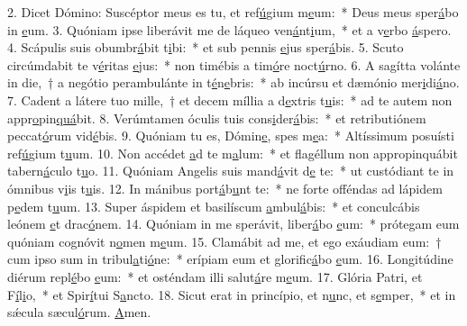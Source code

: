 2. Dicet Dómino: Suscéptor meus es tu, et ref\uline{ú}gium m\uline{e}um:~* Deus meus sper\uline{á}bo in \uline{e}um.
3. Quóniam ipse liberávit me de láqueo ven\uline{á}nt\uline{i}um,~* et a v\uline{e}rbo \uline{á}spero.
4. Scápulis suis obumbr\uline{á}bit t\uline{i}bi:~* et sub pennis \uline{e}jus sper\uline{á}bis.
5. Scuto circúmdabit te v\uline{é}ritas \uline{e}jus:~* non timébis a tim\uline{ó}re noct\uline{ú}rno.
6. A sagítta volánte in die,~† a negótio perambulánte in t\uline{é}n\uline{e}bris:~* ab incúrsu et dæmónio mer\uline{i}di\uline{á}no.
7. Cadent a látere tuo mille,~† et decem míllia a d\uline{e}xtris t\uline{u}is:~* ad te autem non appr\uline{o}pin\uline{quá}bit.
8. Verúmtamen óculis tuis cons\uline{i}der\uline{á}bis:~* et retributiónem peccat\uline{ó}rum vid\uline{é}bis.
9. Quóniam tu es, Dómin\uline{e}, spes m\uline{e}a:~* Altíssimum posuísti ref\uline{ú}gium t\uline{u}um.
10. Non accédet \uline{a}d te m\uline{a}lum:~* et flagéllum non appropinquábit tabern\uline{á}culo t\uline{u}o.
11. Quóniam Angelis suis mand\uline{á}vit d\uline{e} te:~* ut custódiant te in ómnibus v\uline{i}is t\uline{u}is.
12. In mánibus port\uline{á}b\uline{u}nt te:~* ne forte offéndas ad lápidem p\uline{e}dem t\uline{u}um.
13. Super áspidem et basilíscum \uline{a}mbul\uline{á}bis:~* et conculcábis leónem \uline{e}t drac\uline{ó}nem.
14. Quóniam in me sperávit, liber\uline{á}bo \uline{e}um:~* prótegam eum quóniam cognóvit n\uline{o}men m\uline{e}um.
15. Clamábit ad me, et ego exáudiam eum:~† cum ipso sum in tribul\uline{a}ti\uline{ó}ne:~* erípiam eum et glorific\uline{á}bo \uline{e}um.
16. Longitúdine diérum repl\uline{é}bo \uline{e}um:~* et osténdam illi salut\uline{á}re m\uline{e}um.
17. Glória Patri, et F\uline{í}l\uline{i}o,~* et Spir\uline{í}tui S\uline{a}ncto.
18. Sicut erat in princípio, et n\uline{u}nc, et s\uline{e}mper,~* et in sǽcula sæcul\uline{ó}rum. \uline{A}men.
